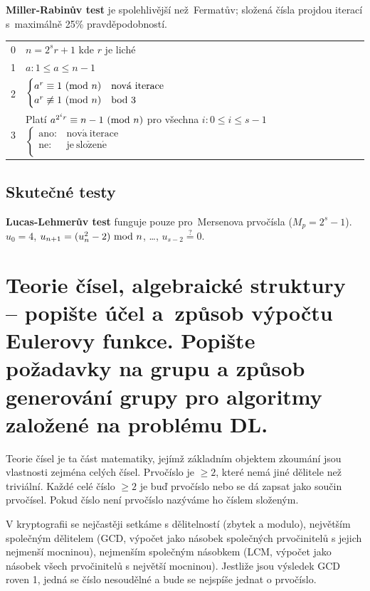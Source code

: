 \noindent \textbf{Miller-Rabinův test} je spolehlivější než~Fermatův; složená čísla projdou iterací s~maximálně 25\% pravděpodobností.

\begin{table}[ht]
\begin{tabular}{l|l}
0 & $n = 2^s r + 1$ kde $r$ je liché \\
1 & $a: 1 \leq a \leq n-1$ \\
2 & $\begin{cases}
a^r \equiv 1 \ (\mathrm{mod}\ n) & \mathrm{nov\acute{a}\ iterace} \\
a^r \not\equiv 1 \ (\mathrm{mod}\ n) & \mathrm{bod\ 3} \\
\end{cases}$ \\
3 & Platí $a^{2^i r} \equiv n-1 \ (\mathrm{mod}\ n)$ pro všechna $i: 0 \leq i \leq s-1$ $\begin{cases}
\mathrm{ano:} & \mathrm{nov\acute{a}\ iterace} \\
\mathrm{ne:} & \mathrm{je\ slo\check{z}en\acute{e}} \\
\end{cases}$ \\
\end{tabular}
\end{table}

\subsection{Skutečné testy}

\textbf{Lucas-Lehmerův test} funguje pouze pro~Mersenova prvočísla ($M_p = 2^s - 1$). \\
$u_0 = 4$, $u_{n+1} = (u_n^2 - 2) \ \mathrm{mod}\ n$, \dots, $u_{s-2} \stackrel{?}{=} 0$.

\clearpage
\section{Teorie čísel, algebraické struktury -- popište účel a~způsob výpočtu Eulerovy funkce. Popište požadavky na grupu a způsob generování grupy pro algoritmy založené na problému DL.}

Teorie čísel je ta část matematiky, jejímž základním objektem zkoumání jsou vlastnosti zejména celých čísel. Prvočíslo je $\geq 2$, které nemá jiné dělitele než triviální. Každé celé číslo $\geq 2$ je buď prvočíslo nebo se dá zapsat jako součin prvočísel. Pokud číslo není prvočíslo nazýváme ho číslem složeným.

V kryptografii se nejčastěji setkáme s dělitelností (zbytek a modulo), největším společným dělitelem (GCD, výpočet jako násobek společných prvočinitelů s jejich nejmenší mocninou), nejmenším společným násobkem (LCM, výpočet jako násobek všech prvočinitelů s největší mocninou). Jestliže jsou výsledek GCD roven 1, jedná se číslo nesoudělné a bude se nejspíše jednat o prvočíslo.

